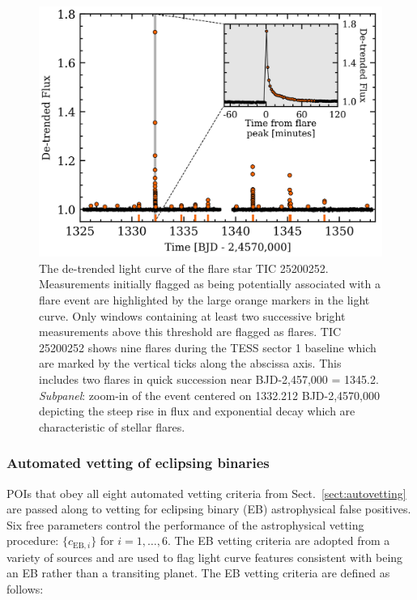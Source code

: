 \begin{figure}
  \centering
  \includegraphics[width=0.8\hsize]{figures/flareLC_25200252.png}
  \caption[Examples of flares detected in the TIC 25200252 light curve.]
          {The de-trended light curve of the flare star TIC 25200252. Measurements initially flagged
    as being potentially associated with a flare event are highlighted by the
    large orange markers in the light curve. Only windows containing at least two successive
    bright measurements above this threshold are flagged as flares. TIC 25200252 shows nine flares
    during the TESS sector 1 baseline which are marked by the vertical ticks along the abscissa axis.
    This includes two flares in quick succession near BJD-2,457,000 = 1345.2.
    \emph{Subpanel}: zoom-in of the event centered on 1332.212 BJD-2,4570,000 depicting the steep rise
    in flux and exponential decay which are characteristic of stellar flares.}
  \label{fig:flare}
\end{figure}


\subsubsection{Automated vetting of eclipsing binaries} \label{sect:autoEB}
POIs that obey all eight automated vetting criteria from Sect.~\ref{sect:autovetting}
are passed along to vetting for eclipsing binary (EB) astrophysical false
positives. Six free parameters control the
performance of the astrophysical vetting procedure: $\{c_{\text{EB},i}\}$ for $i=1,\dots,6$.
The EB vetting criteria are adopted from a variety of sources
\citep{batalha10,bryson13,gunther17,crossfield18}
and are used to flag light curve features consistent with being an EB rather than a transiting
planet. The EB vetting criteria are defined as follows:

